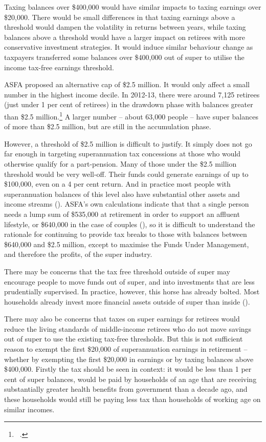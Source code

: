 Taxing balances over \$400,000 would have similar impacts to taxing earnings over \$20,000. There would be small differences in that taxing earnings above a threshold would dampen the volatility in returns between years, while taxing balances above a threshold would have a larger impact on retirees with more conservative investment strategies. It would induce similar behaviour change as taxpayers transferred some balances over \$400,000 out of super to utilise the income tax-free earnings threshold. 

ASFA proposed an alternative cap of \$2.5 million. It would only affect a small number in the highest income decile. In 2012-13, there were around 7,125 retirees (just under 1 per cent of retirees) in the drawdown phase with balances greater than \$2.5 million.\footnote{\gao\ \textcite{ABS2013t}.}   A larger number – about 63,000 people – have super balances of more than \$2.5 million, but are still in the accumulation phase.

However, a threshold of \$2.5 million is difficult to justify. It simply does not go far enough in targeting superannuation tax concessions at those who would otherwise qualify for a part-pension. Many of those under the \$2.5 million threshold would be very well-off. Their funds could generate earnings of up to \$100,000, even on a 4 per cent return. And in practice most people with superannuation balances of this level also have substantial other assets and income streams (). ASFA’s own calculations indicate that that a single person needs a lump sum of \$535,000 at retirement in order to support an affluent lifestyle, or \$640,000 in the case of couples (), so it is difficult to understand the rationale for continuing to provide tax breaks to those with balances between \$640,000 and \$2.5 million, except to maximise the Funds Under Management, and therefore the profits, of the super industry. 

There may be concerns that the tax free threshold outside of super may encourage people to move funds out of super, and into investments that are less prudentially supervised. In practice, however, this horse has already bolted. Most households already invest more financial assets outside of super than inside ().

There may also be concerns that taxes on super earnings for retirees would reduce the living standards of middle-income retirees who do not move savings out of super to use the existing tax-free thresholds. But this is not sufficient reason to exempt the first \$20,000 of superannuation earnings in retirement – whether by exempting the first \$20,000 in earnings or by taxing balances above \$400,000. Firstly the tax should be seen in context: it would be less than 1 per cent of super balances, would be paid by households of an age that are receiving substantially greater health benefits from government than a decade ago, and these households would still be paying less tax than households of working age on similar incomes. 

